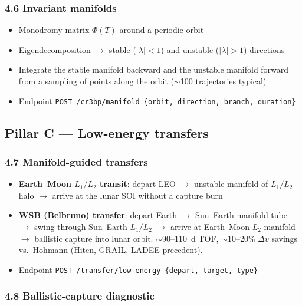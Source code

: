 \documentclass[11pt, a4paper]{article}
\begin{document}
\subsubsection{4.6 Invariant manifolds}

\begin{itemize}[leftmargin=*]
  \item Monodromy matrix $\Phi(T)$ around a periodic orbit
  \item Eigendecomposition $\to$ stable ($|\lambda|<1$) and unstable
        ($|\lambda|>1$) directions
  \item Integrate the stable manifold backward and the unstable manifold
        forward from a sampling of points along the orbit
        ($\sim$100 trajectories typical)
  \item Endpoint
        \texttt{POST /cr3bp/manifold \{orbit, direction, branch, duration\}}
\end{itemize}

\subsection{Pillar C --- Low-energy transfers}

\subsubsection{4.7 Manifold-guided transfers}

\begin{itemize}[leftmargin=*]
  \item \textbf{Earth--Moon $L_1/L_2$ transit}: depart LEO $\to$ unstable
        manifold of $L_1/L_2$ halo $\to$ arrive at the lunar SOI without
        a capture burn
  \item \textbf{WSB (Belbruno) transfer}: depart Earth $\to$ Sun--Earth
        manifold tube $\to$ swing through Sun--Earth $L_1/L_2$ $\to$ arrive
        at Earth--Moon $L_2$ manifold $\to$ ballistic capture into lunar
        orbit. $\sim$90--110~d TOF, $\sim$10--20\% $\Delta v$ savings vs.\
        Hohmann (Hiten, GRAIL, LADEE precedent).
  \item Endpoint
        \texttt{POST /transfer/low-energy \{depart, target, type\}}
\end{itemize}

\subsubsection{4.8 Ballistic-capture diagnostic}
\end{document}
